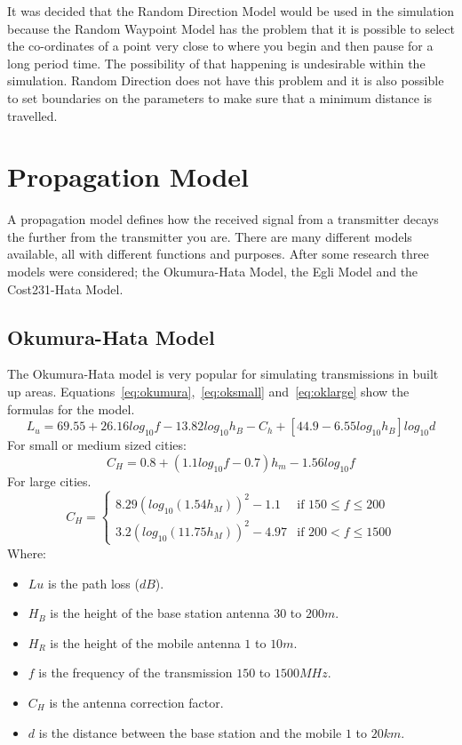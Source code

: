 It was decided that the Random Direction Model would be used in the simulation because the Random Waypoint Model has the problem that it is possible to select the co-ordinates of a point very close to where you begin and then pause for a long period time. The possibility of that happening is undesirable within the simulation. Random Direction does not have this problem and it is also possible to set boundaries on the parameters to make sure that a minimum distance is travelled.~\cite{roy2010handbook}

\section{Propagation Model}\label{propagation}
A propagation model defines how the received signal from a transmitter decays the further from the transmitter you are. There are many different models available, all with different functions and purposes. After some research three models were considered; the Okumura-Hata Model, the Egli Model and the Cost231-Hata Model.
\subsection{Okumura-Hata Model}
The Okumura-Hata model is very popular for simulating transmissions in built up areas. Equations~\ref{eq:okumura},~\ref{eq:oksmall} and~\ref{eq:oklarge} show the formulas for the model.
\begin{equation}\label{eq:okumura}
L_{u}=69.55+26.16log_{10}f-13.82log_{10}h_{B}-C_{h}+[44.9-6.55log_{10}h_{B}]log_{10}d 
\end{equation}
For small or medium sized cities:
\begin{equation}\label{eq:oksmall}
C_{H}=0.8+(1.1log_{10}f-0.7)h_{m}-1.56log_{10}f
\end{equation}
For large cities.
\begin{equation}\label{eq:oklarge}
C_{H}=
	\begin{cases}
	8.29(log_{10}(1.54h_{M}))^{2}-1.1 & \mbox{if } 150 \leq f \leq 200 \\
	3.2(log_{10}(11.75h_{M}))^{2}-4.97 & \mbox{if } 200 < f \leq 1500
	\end{cases}
\end{equation}
Where:
\begin{itemize}
\item $Lu$ is the path loss ($dB$).
\item $H_{B}$ is the height of the base station antenna $30$ to $200 m$.
\item $H_{R}$ is the height of the mobile antenna $1$ to $10 m$.
\item $f$ is the frequency of the transmission $150$ to $1500 MHz$.
\item $C_{H}$ is the antenna correction factor.
\item $d$ is the distance between the base station and the mobile $1$ to $20 km$.
\end{itemize}
